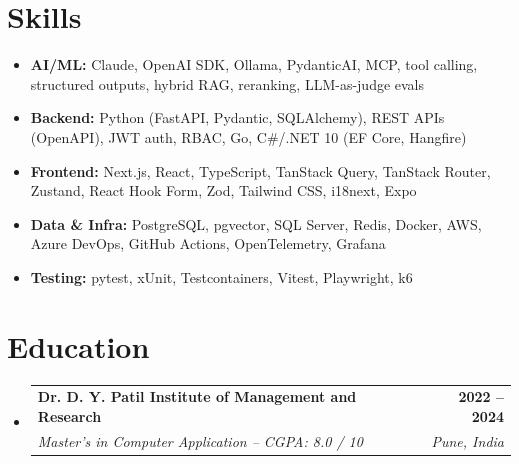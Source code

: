 \documentclass[letterpaper,10pt]{article}
\makeatletter
\newcommand{\resumeSubheading}[4]{
  \vspace{-2pt}\item
    \begin{tabular*}{1.0\textwidth}[t]{l@{\extracolsep{\fill}}r}
      \textbf{#1} & \textbf{\small #2} \\
      \textit{\small#3} & \textit{\small #4} \\
    \end{tabular*}\vspace{-5pt}
}
\newcommand{\resumeSubHeadingListStart}{\begin{itemize}[leftmargin=0.0in, label={}, topsep=2pt, itemsep=1pt]}
\newcommand{\resumeSubHeadingListEnd}{\end{itemize}}
\makeatother
\begin{document}
\section{Skills}
\begin{itemize}[leftmargin=0in, label={}, itemsep=1pt, parsep=0pt, topsep=3pt]
  \small
  \item \textbf{AI/ML:} Claude, OpenAI SDK, Ollama, PydanticAI, MCP, tool calling, structured outputs, hybrid RAG, reranking, LLM-as-judge evals
  \item \textbf{Backend:} Python (FastAPI, Pydantic, SQLAlchemy), REST APIs (OpenAPI), JWT auth, RBAC, Go, C\#/.NET 10 (EF Core, Hangfire)
  \item \textbf{Frontend:} Next.js, React, TypeScript, TanStack Query, TanStack Router, Zustand, React Hook Form, Zod, Tailwind CSS, i18next, Expo
  \item \textbf{Data \& Infra:} PostgreSQL, pgvector, SQL Server, Redis, Docker, AWS, Azure DevOps, GitHub Actions, OpenTelemetry, Grafana
  \item \textbf{Testing:} pytest, xUnit, Testcontainers, Vitest, Playwright, k6
\end{itemize}

\section{Education}
\resumeSubHeadingListStart
  \resumeSubheading
    {Dr. D. Y. Patil Institute of Management and Research}{2022 -- 2024}
    {Master's in Computer Application -- CGPA: 8.0 / 10}{Pune, India}
\resumeSubHeadingListEnd
\end{document}
